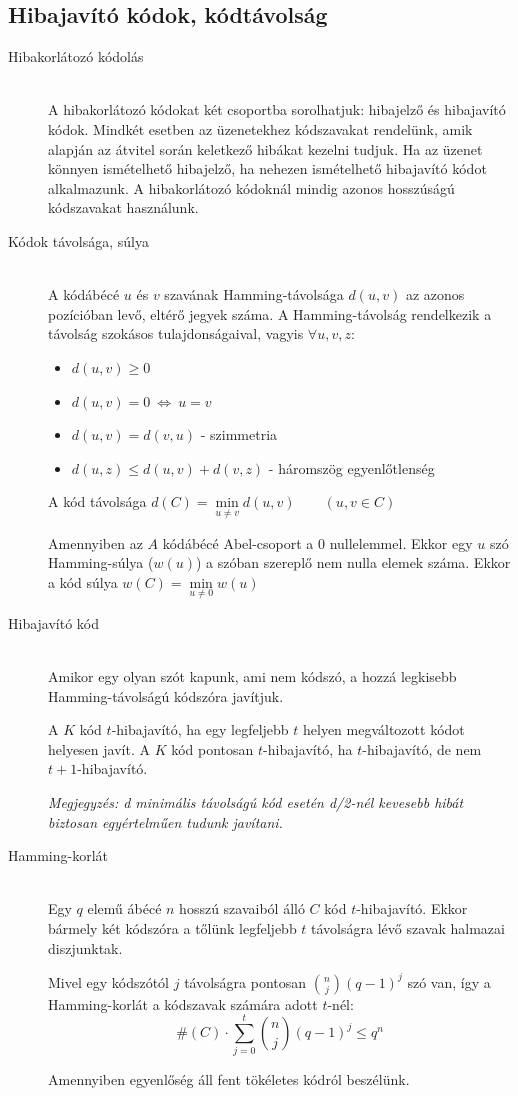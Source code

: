\documentclass[margin=0px]{article}
\begin{document}
		\subsection{Hibajavító kódok, kódtávolság}
			\begin{description}
				\item[Hibakorlátozó kódolás] \hfill \\
					A hibakorlátozó kódokat két csoportba sorolhatjuk: hibajelző és  hibajavító kódok. Mindkét esetben az üzenetekhez kódszavakat rendelünk, amik alapján az átvitel során keletkező hibákat kezelni tudjuk. Ha az üzenet könnyen ismételhető hibajelző, ha nehezen ismételhető hibajavító kódot alkalmazunk. A hibakorlátozó kódoknál mindig azonos hosszúságú kódszavakat használunk. 
				\item[Kódok távolsága, súlya] \hfill \\
					A kódábécé $u$ és $v$ szavának Hamming-távolsága $d(u,v)$ az azonos pozícióban levő, eltérő jegyek száma.  A Hamming-távolság rendelkezik a távolság szokásos tulajdonságaival, vagyis $\forall u,v,z$:
					\begin{itemize}
						\item $d(u,v) \geq 0$
						\item $d(u,v) = 0 \ \Longleftrightarrow \ u = v$
						\item $d(u,v) = d(v,u)$ - szimmetria 
						\item $d(u,z) \leq d(u,v)+d(v,z)$ - háromszög egyenlőtlenség
					\end{itemize}
					A kód távolsága $d(C) = \min\limits_{u\neq v}d(u,v) \qquad (u,v \in C)$
					
					Amennyiben az $A$ kódábécé Abel-csoport a $0$ nullelemmel. Ekkor egy $u$ szó Hamming-súlya ($w(u)$) a szóban szereplő nem nulla elemek száma. Ekkor a kód súlya $w(C)  = \min\limits_{u\neq 0}w(u)$
				\item[Hibajavító kód] \hfill \\
					Amikor egy olyan szót kapunk, ami nem kódszó, a hozzá legkisebb Hamming-távolságú kódszóra javítjuk.
					
					A $K$ kód $t$-hibajavító, ha egy legfeljebb $t$ helyen megváltozott kódot helyesen javít. A $K$ kód pontosan $t$-hibajavító, ha $t$-hibajavító, de nem $t+1$-hibajavító.
					
					\textit{Megjegyzés: d minimális távolságú kód esetén d/2-nél kevesebb hibát biztosan egyértelműen tudunk javítani.}
				\item[Hamming-korlát] \hfill \\
					Egy $q$ elemű ábécé $n$ hosszú szavaiból álló $C$ kód $t$-hibajavító. Ekkor bármely két kódszóra a tőlünk legfeljebb $t$ távolságra lévő szavak halmazai diszjunktak.
					
					Mivel egy kódszótól $j$ távolságra pontosan $\binom{n}{j}(q-1)^j$ szó van, így a Hamming-korlát a kódszavak számára adott $t$-nél:
					\[\#(C) \cdot \sum\limits_{j=0}^{t}\binom{n}{j}(q-1)^j \leq q^n \]
					
					Amennyiben egyenlőség áll fent tökéletes kódról beszélünk.
			\end{description}
\end{document}
